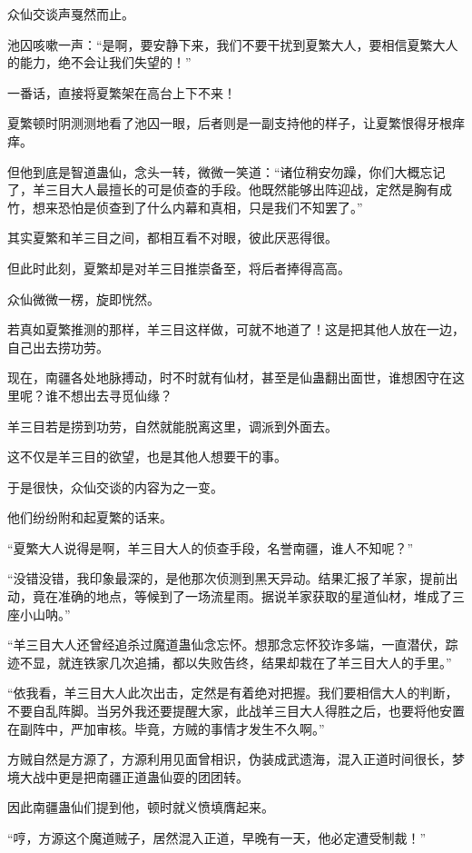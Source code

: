 \begin{this_body}
众仙交谈声戛然而止。

池囚咳嗽一声：“是啊，要安静下来，我们不要干扰到夏繁大人，要相信夏繁大人的能力，绝不会让我们失望的！”

一番话，直接将夏繁架在高台上下不来！

夏繁顿时阴测测地看了池囚一眼，后者则是一副支持他的样子，让夏繁恨得牙根痒痒。

但他到底是智道蛊仙，念头一转，微微一笑道：“诸位稍安勿躁，你们大概忘记了，羊三目大人最擅长的可是侦查的手段。他既然能够出阵迎战，定然是胸有成竹，想来恐怕是侦查到了什么内幕和真相，只是我们不知罢了。”

其实夏繁和羊三目之间，都相互看不对眼，彼此厌恶得很。

但此时此刻，夏繁却是对羊三目推崇备至，将后者捧得高高。

众仙微微一楞，旋即恍然。

若真如夏繁推测的那样，羊三目这样做，可就不地道了！这是把其他人放在一边，自己出去捞功劳。

现在，南疆各处地脉搏动，时不时就有仙材，甚至是仙蛊翻出面世，谁想困守在这里呢？谁不想出去寻觅仙缘？

羊三目若是捞到功劳，自然就能脱离这里，调派到外面去。

这不仅是羊三目的欲望，也是其他人想要干的事。

于是很快，众仙交谈的内容为之一变。

他们纷纷附和起夏繁的话来。

“夏繁大人说得是啊，羊三目大人的侦查手段，名誉南疆，谁人不知呢？”

“没错没错，我印象最深的，是他那次侦测到黑天异动。结果汇报了羊家，提前出动，竟在准确的地点，等候到了一场流星雨。据说羊家获取的星道仙材，堆成了三座小山呐。”

“羊三目大人还曾经追杀过魔道蛊仙念忘怀。想那念忘怀狡诈多端，一直潜伏，踪迹不显，就连铁家几次追捕，都以失败告终，结果却栽在了羊三目大人的手里。”

“依我看，羊三目大人此次出击，定然是有着绝对把握。我们要相信大人的判断，不要自乱阵脚。当另外我还要提醒大家，此战羊三目大人得胜之后，也要将他安置在副阵中，严加审核。毕竟，方贼的事情才发生不久啊。”

方贼自然是方源了，方源利用见面曾相识，伪装成武遗海，混入正道时间很长，梦境大战中更是把南疆正道蛊仙耍的团团转。

因此南疆蛊仙们提到他，顿时就义愤填膺起来。

“哼，方源这个魔道贼子，居然混入正道，早晚有一天，他必定遭受制裁！”


\end{this_body}
